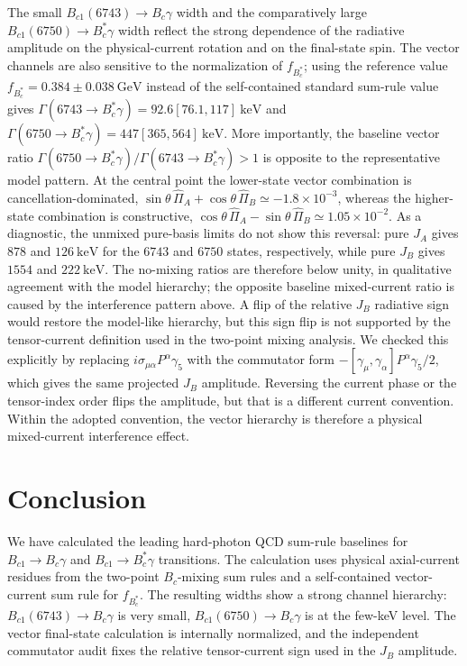 \documentclass[aps,prd,preprint,nofootinbib,superscriptaddress]{revtex4-2}
\newcommand{\Bc}{B_c}
\newcommand{\Bcst}{B_c^\ast}
\newcommand{\Bcone}{B_{c1}}
\newcommand{\GeV}{\mathrm{GeV}}
\newcommand{\keV}{\mathrm{keV}}
\begin{document}
The small \(\Bcone(6743)\to\Bc\gamma\) width and the comparatively large
\(\Bcone(6750)\to\Bcst\gamma\) width reflect the strong dependence of the
radiative amplitude on the physical-current rotation and on the final-state
spin.  The vector channels are also sensitive to the normalization of
\(f_{\Bcst}\); using the reference value \(f_{\Bcst}=0.384\pm0.038~\GeV\)
instead of the self-contained standard sum-rule value gives
\(\Gamma(6743\to\Bcst\gamma)=92.6[76.1,117]~\keV\) and
\(\Gamma(6750\to\Bcst\gamma)=447[365,564]~\keV\).
More importantly, the baseline vector ratio
\(\Gamma(6750\to\Bcst\gamma)/\Gamma(6743\to\Bcst\gamma)>1\) is opposite to the
representative model pattern.  At the central point the lower-state vector
combination is cancellation-dominated,
\(\sin\theta\,\widehat\Pi_A+\cos\theta\,\widehat\Pi_B\simeq -1.8\times10^{-3}\),
whereas the higher-state combination is constructive,
\(\cos\theta\,\widehat\Pi_A-\sin\theta\,\widehat\Pi_B\simeq 1.05\times10^{-2}\).
As a diagnostic, the unmixed pure-basis limits do not show this reversal:
pure \(J_A\) gives \(878\) and \(126~\keV\) for the \(6743\) and \(6750\)
states, respectively, while pure \(J_B\) gives \(1554\) and \(222~\keV\).
The no-mixing ratios are therefore below unity, in qualitative agreement with
the model hierarchy; the opposite baseline mixed-current ratio is caused by
the interference pattern above.
A flip of the relative \(J_B\) radiative sign would restore the model-like
hierarchy, but this sign flip is not supported by the tensor-current
definition used in the two-point mixing analysis.  We checked this explicitly
by replacing \(i\sigma_{\mu\alpha}P^\alpha\gamma_5\) with the commutator form
\(-[\gamma_\mu,\gamma_\alpha]P^\alpha\gamma_5/2\), which gives the same
projected \(J_B\) amplitude.  Reversing the current phase or the tensor-index
order flips the amplitude, but that is a different current convention.  Within
the adopted convention, the vector hierarchy is therefore a physical
mixed-current interference effect.

\section{Conclusion}
\label{sec:concl}

We have calculated the leading hard-photon QCD sum-rule baselines for
\(\Bcone\to \Bc\gamma\) and \(\Bcone\to\Bcst\gamma\) transitions.  The
calculation uses physical axial-current residues from the two-point
\(B_c\)-mixing sum rules and a self-contained vector-current sum rule for
\(f_{\Bcst}\).  The resulting widths show a strong channel hierarchy:
\(\Bcone(6743)\to\Bc\gamma\) is very small, \(\Bcone(6750)\to\Bc\gamma\) is at
the few-keV level.  The vector final-state calculation is internally
normalized, and the independent commutator audit fixes the relative
tensor-current sign used in the \(J_B\) amplitude.
\end{document}
